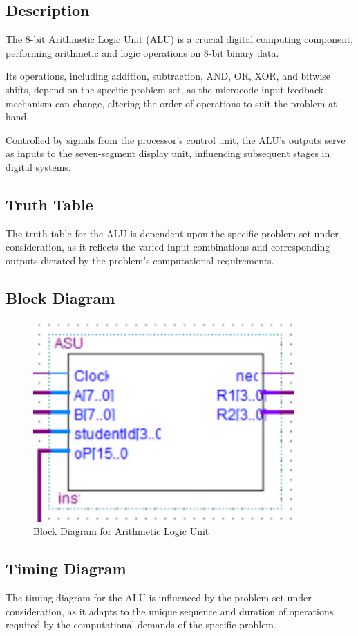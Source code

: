 
\subsection{{Description}}

	{The 8-bit Arithmetic Logic Unit (ALU) is a crucial digital computing component, performing arithmetic and logic operations on 8-bit binary data.}
	
	{Its operations, including addition, subtraction, AND, OR, XOR, and bitwise shifts, depend on the specific problem set, as the microcode input-feedback mechanism can change, altering the order of operations to suit the problem at hand.}
	
	{Controlled by signals from the processor's control unit, the ALU's outputs serve as inputs to the seven-segment display unit, influencing subsequent stages in digital systems.}

\subsection{{Truth Table}}

	{The truth table for the ALU is dependent upon the specific problem set under consideration, as it reflects the varied input combinations and corresponding outputs dictated by the problem's computational requirements.}

\subsection{{Block Diagram}}

	\begin{figure}[H]
		\centering
		\includegraphics[width=10cm]{Pictures/ALU.png}
		\caption{{Block Diagram for Arithmetic Logic Unit}}
		\label{}
	\end{figure}


\subsection{{Timing Diagram}}

	{The timing diagram for the ALU is influenced by the problem set under consideration, as it adapts to the unique sequence and duration of operations required by the computational demands of the specific problem.}
